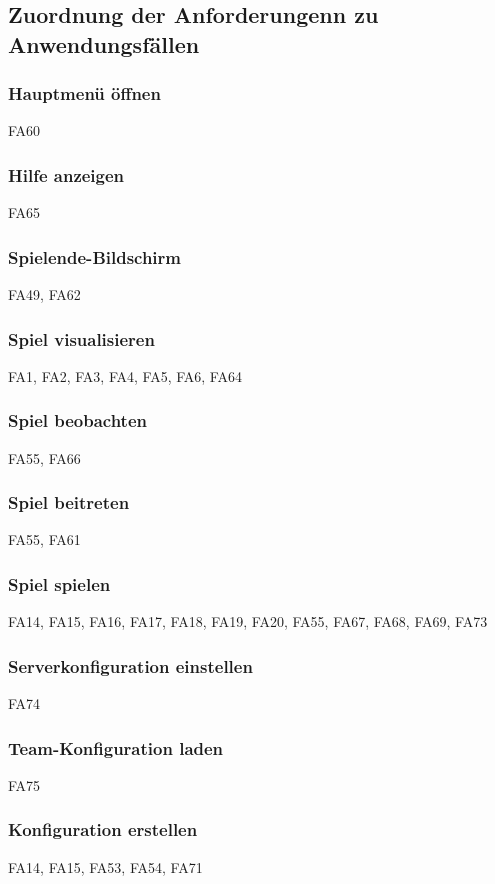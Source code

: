 \subsection{Zuordnung der Anforderungenn zu Anwendungsfällen}
\subsubsection{Hauptmenü öffnen}
FA60

\subsubsection{Hilfe anzeigen}
FA65

\subsubsection{Spielende-Bildschirm}
FA49,
FA62

\subsubsection{Spiel visualisieren}
FA1,
FA2, 
FA3, 
FA4, 
FA5, 
FA6, 
FA64

\subsubsection{Spiel beobachten}
FA55,
FA66

\subsubsection{Spiel beitreten}
FA55,
FA61

\subsubsection{Spiel spielen}
FA14, 
FA15, 
FA16, 
FA17, 
FA18, 
FA19, 
FA20, 
FA55, 
FA67,
FA68, 
FA69,
FA73 

\subsubsection{Serverkonfiguration einstellen}
FA74 

\subsubsection{Team-Konfiguration laden}
FA75 

\subsubsection{Konfiguration erstellen}
FA14,
FA15, 
FA53, 
FA54, 
FA71

